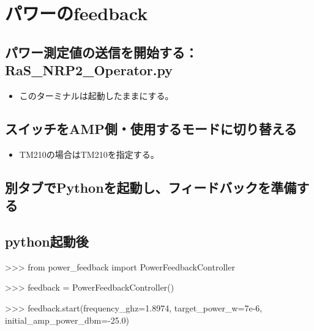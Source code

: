 \documentclass[a4paper,11pt]{ltjsarticle}
\begin{document}
\section{パワーのfeedback}

\subsection{パワー測定値の送信を開始する：RaS\_NRP2\_Operator.py}

\begin{command}


\end{command}

\begin{itemize}

\item このターミナルは起動したままにする。

\end{itemize}

\subsection{スイッチをAMP側・使用するモードに切り替える}

\begin{command}


\end{command}

\begin{itemize}

\item TM210の場合はTM210を指定する。

\end{itemize}

\subsection{別タブでPythonを起動し、フィードバックを準備する}

\subsection{python起動後}

\begin{command}

>>> from power_feedback import PowerFeedbackController

>>> feedback = PowerFeedbackController()

>>> feedback.start(frequency_ghz=1.8974, target_power_w=7e-6, initial_amp_power_dbm=-25.0)

\end{command}
\end{document}
